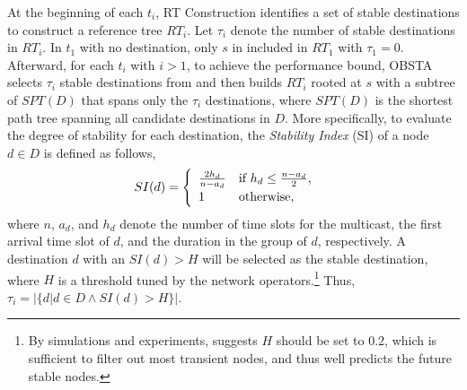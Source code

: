 \documentclass[10pt, conference, letterpaper]{IEEEtran}
\theoremstyle{definition}
\begin{document}
At the beginning of each $t_i$, RT Construction identifies a set of stable destinations  \cite{StablePeer
} to construct a reference tree $RT_i$.
Let $\tau_{i}$ denote the number of stable destinations in $RT_i$. In $t_1$ with no destination, only $s$ in included in $RT_1$ with $\tau_{1}=0$. 
Afterward, for each $t_i$ with $i>1$, to achieve the performance bound, OBSTA selects $\tau_{i}$ stable destinations from \cite{StablePeer
} and then builds $RT_{i}$ rooted at $s$ with a subtree of $SPT(D)$ that spans only the $\tau_{i}$ destinations, where $SPT(D)$ is the shortest path tree spanning all candidate destinations in $D$. More specifically, to evaluate the degree of stability for each destination, the \emph{Stability Index} (SI) \cite{StablePeer} of a node $d\in D$ is defined as follows,
\begin{equation}\notag
SI(d)=
\begin{cases}
\begin{array}{ll}
\frac{2h_d}{n-a_d} & \text{if } h_d\leq \frac{n-a_d}{2},\\
1 & \text{otherwise},\\
\end{array}
\end{cases}
\end{equation}
where $n$, $a_d$, and $h_d$ denote the number of time slots for the multicast, the first arrival time slot of $d$, and the duration in the group of $d$, respectively.
A destination $d$ with an $SI(d)>H$ will be selected as the stable destination, where $H$ is a threshold tuned by the network operators.\footnote{By simulations and experiments, \cite{StablePeer} suggests $H$ should be set to $0.2$, which is sufficient to filter out most transient nodes, and thus well predicts the future stable nodes.} Thus, $\tau_i=|\{d| d\in D \wedge SI(d)> H\}|$.

\end{document}
